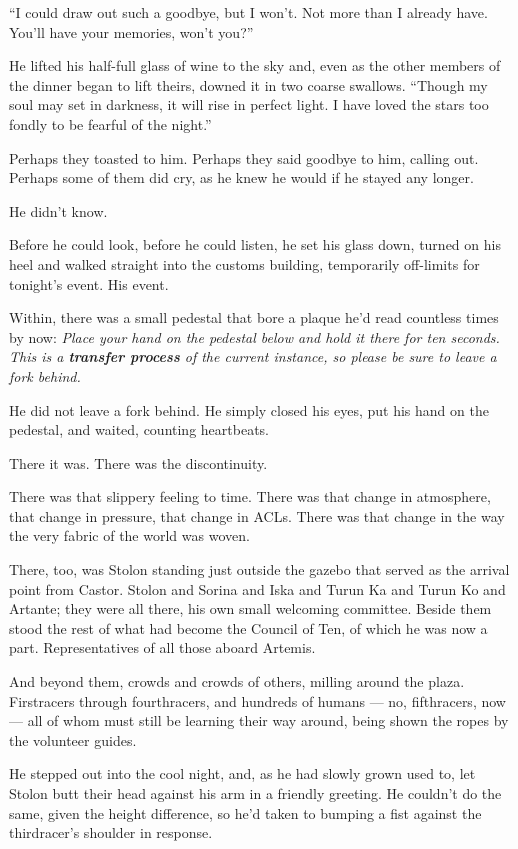 ``I could draw out such a goodbye, but I won't. Not more than I already have. You'll have your memories, won't you?''

He lifted his half-full glass of wine to the sky and, even as the other members of the dinner began to lift theirs, downed it in two coarse swallows. ``Though my soul may set in darkness, it will rise in perfect light. I have loved the stars too fondly to be fearful of the night.''

Perhaps they toasted to him. Perhaps they said goodbye to him, calling out. Perhaps some of them did cry, as he knew he would if he stayed any longer.

He didn't know.

Before he could look, before he could listen, he set his glass down, turned on his heel and walked straight into the customs building, temporarily off-limits for tonight's event. His event.

Within, there was a small pedestal that bore a plaque he'd read countless times by now: \emph{Place your hand on the pedestal below and hold it there for ten seconds. This is a \textbf{transfer process} of the current instance, so please be sure to leave a fork behind.}

He did not leave a fork behind. He simply closed his eyes, put his hand on the pedestal, and waited, counting heartbeats.

There it was. There was the discontinuity.

There was that slippery feeling to time. There was that change in atmosphere, that change in pressure, that change in ACLs. There was that change in the way the very fabric of the world was woven.

There, too, was Stolon standing just outside the gazebo that served as the arrival point from Castor. Stolon and Sorina and Iska and Turun Ka and Turun Ko and Artante; they were all there, his own small welcoming committee. Beside them stood the rest of what had become the Council of Ten, of which he was now a part. Representatives of all those aboard Artemis.

And beyond them, crowds and crowds of others, milling around the plaza. Firstracers through fourthracers, and hundreds of humans --- no, fifthracers, now --- all of whom must still be learning their way around, being shown the ropes by the volunteer guides.

He stepped out into the cool night, and, as he had slowly grown used to, let Stolon butt their head against his arm in a friendly greeting. He couldn't do the same, given the height difference, so he'd taken to bumping a fist against the thirdracer's shoulder in response.

